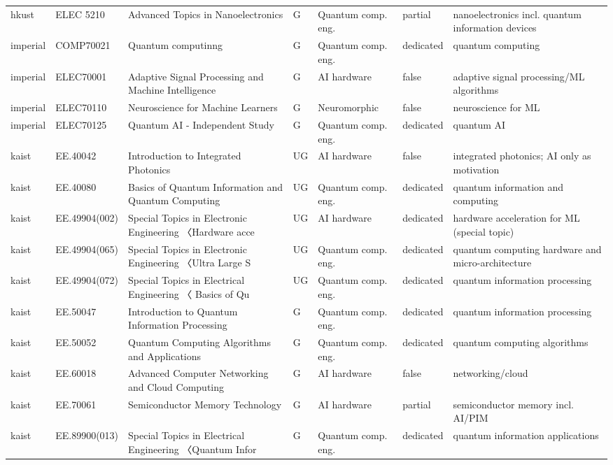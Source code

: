 \documentclass[10pt]{article}
\begin{document}
\begin{longtable}{@{}llL{4.6cm}llll@{}}
hkust & ELEC 5210 & Advanced Topics in Nanoelectronics & G & Quantum comp. eng. & partial & nanoelectronics incl. quantum information devices \\
imperial & COMP70021 & Quantum computinng & G & Quantum comp. eng. & dedicated & quantum computing \\
imperial & ELEC70001 & Adaptive Signal Processing and Machine Intelligence & G & AI hardware & false & adaptive signal processing/ML algorithms \\
imperial & ELEC70110 & Neuroscience for Machine Learners & G & Neuromorphic & false & neuroscience for ML \\
imperial & ELEC70125 & Quantum AI - Independent Study & G & Quantum comp. eng. & dedicated & quantum AI \\
kaist & EE.40042 & Introduction to Integrated Photonics & UG & AI hardware & false & integrated photonics; AI only as motivation \\
kaist & EE.40080 & Basics of Quantum Information and Quantum Computing & UG & Quantum comp. eng. & dedicated & quantum information and computing \\
kaist & EE.49904(002) & Special Topics in Electronic Engineering 〈Hardware acce & UG & AI hardware & dedicated & hardware acceleration for ML (special topic) \\
kaist & EE.49904(065) & Special Topics in Electronic Engineering 〈Ultra Large S & UG & Quantum comp. eng. & dedicated & quantum computing hardware and micro-architecture \\
kaist & EE.49904(072) & Special Topics in Electrical Engineering 〈 Basics of Qu & UG & Quantum comp. eng. & dedicated & quantum information processing \\
kaist & EE.50047 & Introduction to Quantum Information Processing & G & Quantum comp. eng. & dedicated & quantum information processing \\
kaist & EE.50052 & Quantum Computing Algorithms and Applications & G & Quantum comp. eng. & dedicated & quantum computing algorithms \\
kaist & EE.60018 & Advanced Computer Networking and Cloud Computing & G & AI hardware & false & networking/cloud \\
kaist & EE.70061 & Semiconductor Memory Technology & G & AI hardware & partial & semiconductor memory incl. AI/PIM \\
kaist & EE.89900(013) & Special Topics in Electrical Engineering 〈Quantum Infor & G & Quantum comp. eng. & dedicated & quantum information applications \\

\end{longtable}
\end{document}
